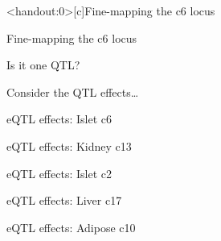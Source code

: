 \documentclass[12pt,t]{beamer}
\begin{document}
\begin{frame}<handout:0>[c]{Fine-mapping the c6 locus}
\addtocounter{framenumber}{-1}
\end{frame}

\begin{frame}[c]{Fine-mapping the c6 locus}
\addtocounter{framenumber}{-1}

\note{
}

\end{frame}



\begin{frame}[c]{}
\centerline{\Large \ticolor Is it one QTL?}

\note{
}

\end{frame}


\begin{frame}[c]{}
\centerline{\Large \ticolor Consider the QTL effects\dots}

\note{
}

\end{frame}



\begin{frame}[c]{eQTL effects: Islet c6}

\note{
}

\end{frame}

\begin{frame}[c]{eQTL effects: Kidney c13}

\note{
}

\end{frame}

\begin{frame}[c]{eQTL effects: Islet c2}

\note{
}

\end{frame}

\begin{frame}[c]{eQTL effects: Liver c17}

\note{
}

\end{frame}

\begin{frame}[c]{eQTL effects: Adipose c10}

\note{
}

\end{frame}
\end{document}

